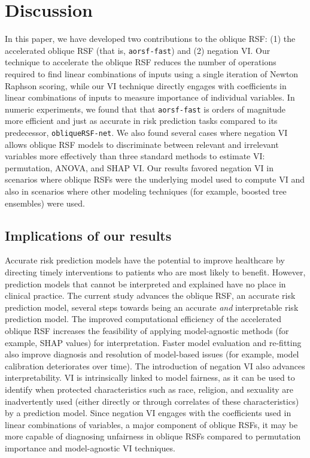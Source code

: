 \documentclass[twoside,11pt]{article}\usepackage[]{graphicx}\usepackage[]{xcolor}
\newcommand{\ie}{that is}
\newcommand{\eg}{for example}
\begin{document}
\section{Discussion}

In this paper, we have developed two contributions to the oblique RSF: (1) the accelerated oblique RSF (\ie, \texttt{aorsf-fast}) and (2) negation VI. Our technique to accelerate the oblique RSF reduces the number of operations required to find linear combinations of inputs using a single iteration of Newton Raphson scoring, while our VI technique directly engages with coefficients in linear combinations of inputs to measure importance of individual variables. In numeric experiments, we found that that \texttt{aorsf-fast} is orders of magnitude more efficient and just as accurate in risk prediction tasks compared to its predecessor, \texttt{obliqueRSF-net}. We also found several cases where negation VI allows oblique RSF models to discriminate between relevant and irrelevant variables more effectively than three standard methods to estimate VI: permutation, ANOVA, and SHAP VI. Our results favored negation VI in scenarios where oblique RSFs were the underlying model used to compute VI and also in scenarios where other modeling techniques (\eg, boosted tree ensembles) were used.

\subsection{Implications of our results}

Accurate risk prediction models have the potential to improve healthcare by directing timely interventions to patients who are most likely to benefit. However, prediction models that cannot be interpreted and explained have no place in clinical practice. The current study advances the oblique RSF, an accurate risk prediction model, several steps towards being an accurate \textit{and} interpretable risk prediction model. The improved computational efficiency of the accelerated oblique RSF increases the feasibility of applying model-agnostic methods (\eg, SHAP values) for interpretation. Faster model evaluation and re-fitting also improve diagnosis and resolution of model-based issues (\eg, model calibration deteriorates over time). The introduction of negation VI also advances interpretability. VI is intrinsically linked to model fairness, as it can be used to identify when protected characteristics such as race, religion, and sexuality are inadvertently used (either directly or through correlates of these characteristics) by a prediction model. Since negation VI  engages with the coefficients used in linear combinations of variables, a major component of oblique RSFs, it may be more capable of diagnosing unfairness in oblique RSFs compared to permutation importance and model-agnostic VI techniques.
\end{document}
